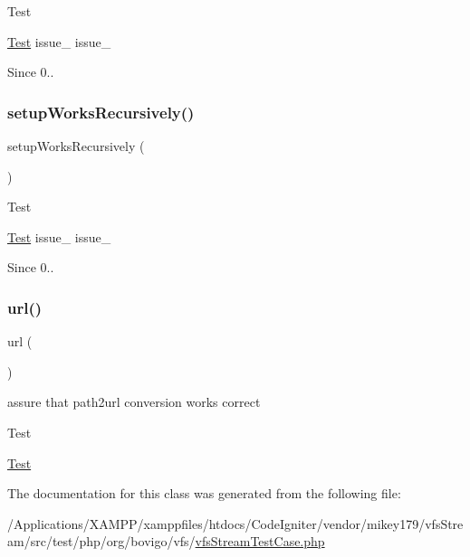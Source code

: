 \begin{DoxyRefDesc}{Test}
\item[\mbox{\hyperlink{test__test000092}{Test}}]issue\+\_  issue\+\_ \end{DoxyRefDesc}
\begin{DoxySince}{Since}
0.. 
\end{DoxySince}
\mbox{\label{classorg_1_1bovigo_1_1vfs_1_1vfs_stream_test_case_ac44031783b50823bfbbf69b87be6e7d6}} 
\subsubsection{\texorpdfstring{setup\+Works\+Recursively()}{setupWorksRecursively()}}
{\footnotesize\ttfamily setup\+Works\+Recursively (\begin{DoxyParamCaption}{ }\end{DoxyParamCaption})}

\begin{DoxyRefDesc}{Test}
\item[\mbox{\hyperlink{test__test000095}{Test}}]issue\+\_  issue\+\_ \end{DoxyRefDesc}
\begin{DoxySince}{Since}
0.. 
\end{DoxySince}
\mbox{\label{classorg_1_1bovigo_1_1vfs_1_1vfs_stream_test_case_abc5ed2ad3f9365fb31cc1eb625b974d9}} 
\subsubsection{\texorpdfstring{url()}{url()}}
{\footnotesize\ttfamily url (\begin{DoxyParamCaption}{ }\end{DoxyParamCaption})}

assure that path2url conversion works correct

\begin{DoxyRefDesc}{Test}
\item[\mbox{\hyperlink{test__test000076}{Test}}]\end{DoxyRefDesc}


The documentation for this class was generated from the following file\+:\begin{DoxyCompactItemize}
\item 
/\+Applications/\+X\+A\+M\+P\+P/xamppfiles/htdocs/\+Code\+Igniter/vendor/mikey179/vfs\+Stream/src/test/php/org/bovigo/vfs/\mbox{\hyperlink{vfs_stream_test_case_8php}{vfs\+Stream\+Test\+Case.\+php}}\end{DoxyCompactItemize}
